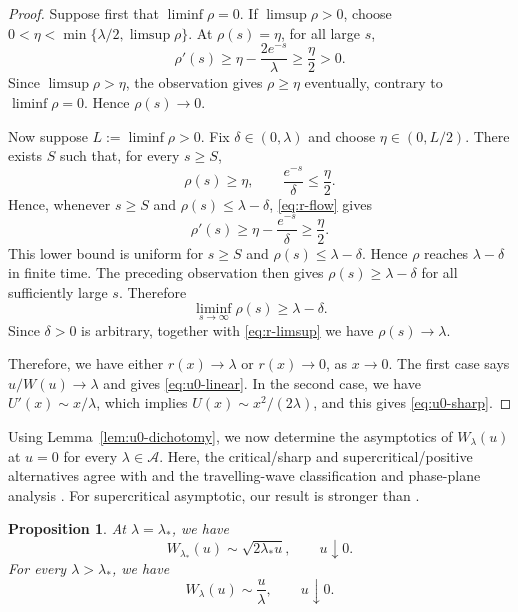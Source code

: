 \documentclass[12pt,preprint]{amsart}
\numberwithin{equation}{section}
\theoremstyle{plain}
\newtheorem{proposition}[theorem]{Proposition}
\theoremstyle{definition}
\begin{document}
\begin{proof}
Suppose first that \(\liminf\rho=0\).  If \(\limsup\rho>0\), choose
\(0<\eta<\min\{\lambda/2,\limsup\rho\}\).  At \(\rho(s)=\eta\), for all large \(s\),
\[
 \rho'(s)\ge\eta-\frac{2e^{-s}}\lambda\ge\frac\eta2>0.
\]
Since \(\limsup\rho>\eta\), the observation gives \(\rho\ge\eta\) eventually,
contrary to \(\liminf\rho=0\).  Hence \(\rho(s)\to0\).

Now suppose \(L:=\liminf\rho>0\).  Fix \(\delta\in(0,\lambda)\) and choose
\(\eta\in(0,L/2)\).  There exists \(S\) such that, for every \(s\ge S\),
\[
 \rho(s)\ge\eta,
 \qquad
 \frac{e^{-s}}\delta\le\frac\eta2.
\]
Hence, whenever \(s\ge S\) and \(\rho(s)\le\lambda-\delta\),
\eqref{eq:r-flow} gives
\[
 \rho'(s)
 \ge\eta-\frac{e^{-s}}\delta
 \ge\frac\eta2.
\]
This lower bound is uniform for $s\ge S$ and
$\rho(s)\le\lambda-\delta$.  Hence $\rho$ reaches
$\lambda-\delta$ in finite time.  The preceding observation then gives
\(\rho(s)\ge\lambda-\delta\) for all sufficiently large \(s\).  Therefore
\[
 \liminf_{s\to\infty}\rho(s)\ge\lambda-\delta.
\]
Since \(\delta>0\) is arbitrary, together with \eqref{eq:r-limsup} we have
\(\rho(s)\to\lambda\).

Therefore, we have either \(r(x)\to \lambda\) or \(r(x)\to0\), as \(x\to 0\).  The first case says
\(u/W(u)\to \lambda\) and gives \eqref{eq:u0-linear}.  In the second case, we have
\(U'(x)\sim x/\lambda\), which implies
\(U(x)\sim x^2/(2\lambda)\), and this gives
\eqref{eq:u0-sharp}.
\end{proof}

Using Lemma~\ref{lem:u0-dichotomy}, we now determine the asymptotics of
$W_\lambda(u)$ at $u=0$ for every $\lambda\in\mathcal A$. Here, the critical/sharp and supercritical/positive alternatives agree with
\cite{EnguicaGavioliSanchez2013} and the travelling-wave classification and phase-plane analysis \cite{AudritoVazquez2017}. For supercritical asymptotic, our result is stronger than \cite{EnguicaGavioliSanchez2013}.

\begin{proposition}
\label{prop:critical-branches}
At \(\lambda = \lambda_*\), we have
\begin{equation}
 W_{\lambda_*}(u)\sim\sqrt{2\lambda_*u},
 \qquad u\downarrow0.
 \label{eq:critical-sharp-branch}
\end{equation}
For every \(\lambda>\lambda_*\), we have
\begin{equation}
 W_\lambda(u)\sim\frac u\lambda,
 \qquad u\downarrow0.
 \label{eq:supercritical-linear-branch}
\end{equation}
\end{proposition}
\end{document}
